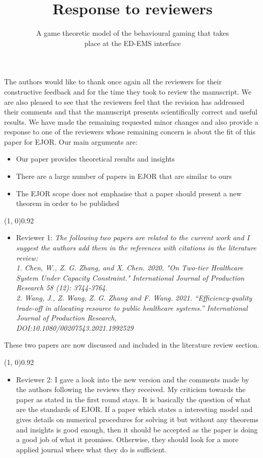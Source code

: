 \documentclass{article}
\title{Response to reviewers}
\author{A game theoretic model of the behavioural gaming that takes \\
place at the ED-EMS interface}
\begin{document}
    \maketitle

    The authors would like to thank once again all the reviewers for their
    constructive feedback and for
    the time they took to review the manuscript.
    We are also pleased to see that the reviewers feel that the revision has
    addressed their comments and that the manuscript presents scientifically
    correct and useful results.
    We have made the remaining requested minor changes and also provide a
    response to one of the reviewers whose remaining concern is about the fit
    of this paper for EJOR.
    Our main arguments are:
    \begin{itemize}
        \item Our paper provides theoretical results and insights
        \item There are a large number of papers in EJOR that are similar to ours
        \item The EJOR scope does not emphasise that a paper should present a
        new theorem in order to be published
    \end{itemize}


    \line(1, 0){0.92\textwidth}
    \begin{itemize}
        \item Reviewer 1: \textit{The following two papers are related to the
        current work and I suggest the authors add them in the references with
        citations in the literature review: \\
        1. Chen, W., Z. G. Zhang, and X. Chen. 2020. "On Two-tier Healthcare
        System Under Capacity Constraint." International Journal of Production
        Research 58 (12): 3744-3764. \\
        2. Wang, J., Z. Wang, Z. G. Zhang and F. Wang. 2021.
        ``Efficiency-quality trade-off in allocating resource to public
        healthcare systems.'' International Journal of Production Research, \\
        DOI:10.1080/00207543.2021.1992529}
    \end{itemize}

    These two papers are now discussed and included in the literature review
    section.

    \line(1, 0){0.92\textwidth}
    \begin{itemize}
        \item Reviewer 2: I gave a look into the new version and the comments
        made by the authors following the reviews they received.
        My criticism towards the paper as stated in the first round stays.
        It is basically the question of what are the standards of EJOR.
        If a paper which states a interesting model and gives details on
        numerical procedures for solving it but without any theorems and
        insights is good enough, then it should be accepted as the paper is
        doing a good job of what it promises.
        Otherwise, they should look for a more applied journal where what they
        do is sufficient.
    \end{itemize}
\end{document}
